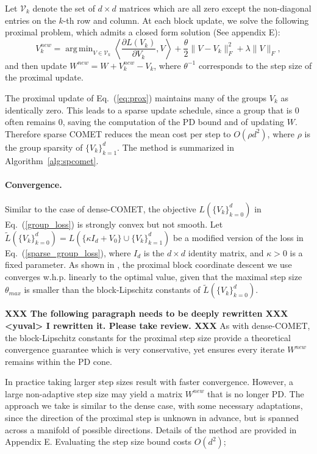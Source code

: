 \documentclass[twoside,11pt]{article}
\newcommand\mat[1]{{#1}}
\newcommand{\W}{\mat{W}}
\newcommand{\Vk}{\mat{V_k}}
\newcommand{\Vg}{\{\Vk\}_{k=0}^{d}} %
\newcommand{\Vgrc}{\{\Vk\}_{k=1}^{d}} %
\renewcommand{\eqref}[1]{Eq.~(\ref{#1})}
\DeclareMathOperator*{\argmin}{arg\,min}
\begin{document}
Let $\mathcal{V}_k$ denote the set of $d \times d$ matrices which are all zero except the non-diagonal entries on the $k$-th row and column. At each block update, we solve the following proximal problem, which admits a closed form solution \citep{bach2012optimization} (See appendix E):
\begin{equation}\label{eq:prox}
V_k^{new} = \argmin_{\mat{V} \in \mathcal{V}_k} \left\langle \frac{\partial{L (V_k)}}{\partial V_k}, \mat{V} \right\rangle + \frac{\theta}{2}\|V - V_k\|_F^2 + \lambda \|V\|_F,
\end{equation}
and then update $\W^{new} = \W + V_k^{new} - V_k$, where $\theta^{-1}$ corresponds to the step size of the proximal update.

The proximal update of \eqref{eq:prox} maintains many of the groups $V_k$ as identically zero. This leads to a sparse update schedule, since a group that is $0$ often remains $0$, saving the computation of the PD bound and of updating $\W$. Therefore sparse COMET reduces the mean cost per step to $O(\rho d^2)$, where $\rho$ is the group sparsity of $\Vgrc$. The method is summarized in Algorithm~\ref{alg:spcomet}.

\paragraph{Convergence.}
Similar to the case of dense-COMET, the objective $L(\Vg)$ in \eqref{group_loss} is strongly convex but not smooth. Let $\tilde{L}(\Vg) = L(\{\kappa I_d + V_0\} \cup \{V_k\}_{k=1}^d)$ be a modified version of the loss in \eqref{sparse_group_loss}, where $I_d$ is the $d \times d$ identity matrix, and $\kappa>0$ is a fixed parameter.
As shown in \cite[Theorem 7]{richtarik2014iteration}, the proximal block coordinate descent we use converges w.h.p. linearly to the optimal value, given that the maximal step size $\theta_{max}$ is smaller than the block-Lipschitz constants of $\tilde{L}(\Vg)$. 

{\bf XXX The following paragraph needs to be deeply rewritten XXX <yuval> I rewritten it. Please take review. XXX}
As with dense-COMET, the block-Lipschitz constants for the proximal step size provide a theoretical convergence guarantee which is very conservative, yet ensures every iterate $\W^{new}$ remains within the PD cone.

In practice taking larger step sizes result with faster convergence.
However, a large non-adaptive step size may yield a matrix $\W^{new}$ that is no longer PD. The approach we take is similar to the dense case, with some necessary adaptations, since the direction of the proximal step is unknown in advance, but is spanned across a manifold of possible directions. Details of the method are provided in Appendix E. Evaluating the step size bound costs $O(d^2)$;  
\end{document}

